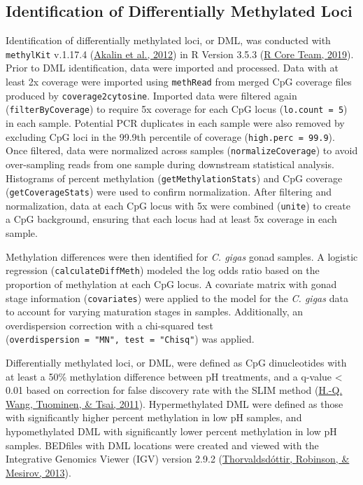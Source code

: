 \documentclass [11pt, proquest] {uwthesis}[2015/03/03]
\begin{document}
\hypertarget{identification-of-differentially-methylated-loci}{%
\subsection{Identification of Differentially Methylated Loci}\label{identification-of-differentially-methylated-loci}}

Identification of differentially methylated loci, or DML, was conducted with \texttt{methylKit} v.1.17.4 (\protect\hyperlink{ref-Akalin2012}{Akalin et al., 2012}) in R Version 3.5.3 (\protect\hyperlink{ref-R_Core_Team2019}{R Core Team, 2019}). Prior to DML identification, data were imported and processed. Data with at least 2x coverage were imported using \texttt{methRead} from merged CpG coverage files produced by \texttt{coverage2cytosine}. Imported data were filtered again (\texttt{filterByCoverage}) to require 5x coverage for each CpG locus (\texttt{lo.count\ =\ 5}) in each sample. Potential PCR duplicates in each sample were also removed by excluding CpG loci in the 99.9th percentile of coverage (\texttt{high.perc\ =\ 99.9}). Once filtered, data were normalized across samples (\texttt{normalizeCoverage}) to avoid over-sampling reads from one sample during downstream statistical analysis. Histograms of percent methylation (\texttt{getMethylationStats}) and CpG coverage (\texttt{getCoverageStats}) were used to confirm normalization. After filtering and normalization, data at each CpG locus with 5x were combined (\texttt{unite}) to create a CpG background, ensuring that each locus had at least 5x coverage in each sample.

Methylation differences were then identified for \emph{C. gigas} gonad samples. A logistic regression (\texttt{calculateDiffMeth}) modeled the log odds ratio based on the proportion of methylation at each CpG locus. A covariate matrix with gonad stage information (\texttt{covariates}) were applied to the model for the \emph{C. gigas} data to account for varying maturation stages in samples. Additionally, an overdispersion correction with a chi-squared test (\texttt{overdispersion\ =\ "MN",\ test\ =\ "Chisq"}) was applied.

Differentially methylated loci, or DML, were defined as CpG dinucleotides with at least a 50\% methylation difference between pH treatments, and a q-value \textless{} 0.01 based on correction for false discovery rate with the SLIM method (\protect\hyperlink{ref-Wang2011}{H.-Q. Wang, Tuominen, \& Tsai, 2011}). Hypermethylated DML were defined as those with significantly higher percent methylation in low pH samples, and hypomethylated DML with significantly lower percent methylation in low pH samples. BEDfiles with DML locations were created and viewed with the Integrative Genomics Viewer (IGV) version 2.9.2 (\protect\hyperlink{ref-Thorvaldsdottir2013}{Thorvaldsdóttir, Robinson, \& Mesirov, 2013}).
\end{document}
